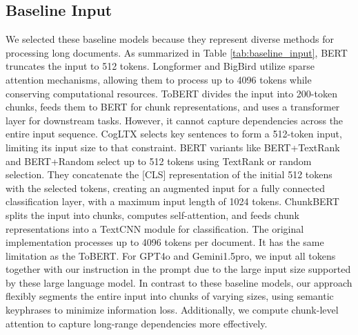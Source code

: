 \documentclass[11pt]{article}
\begin{document}
\subsection{Baseline Input}
\label{app: baseline input}
We selected these baseline models because they represent diverse methods for processing long documents. As summarized in Table \ref{tab:baseline_input}, BERT truncates the input to 512 tokens. Longformer and BigBird utilize sparse attention mechanisms, allowing them to process up to 4096 tokens while conserving computational resources. ToBERT divides the input into 200-token chunks, feeds them to BERT for chunk representations, and uses a transformer layer for downstream tasks. However, it cannot capture dependencies across the entire input sequence. CogLTX selects key sentences to form a 512-token input, limiting its input size to that constraint. BERT variants like BERT+TextRank and BERT+Random select up to 512 tokens using TextRank or random selection. They concatenate the [CLS] representation of the initial 512 tokens with the selected tokens, creating an augmented input for a fully connected classification layer, with a maximum input length of 1024 tokens. ChunkBERT splits the input into chunks, computes self-attention, and feeds chunk representations into a TextCNN module for classification. The original implementation processes up to 4096 tokens per document. It has the same limitation as the ToBERT. For GPT4o and Gemini1.5pro, we input all tokens together with our instruction in the prompt due to the large input size supported by these large language model. In contrast to these baseline models, our approach flexibly segments the entire input into chunks of varying sizes, using semantic keyphrases to minimize information loss. Additionally, we compute chunk-level attention to capture long-range dependencies more effectively.
\end{document}
